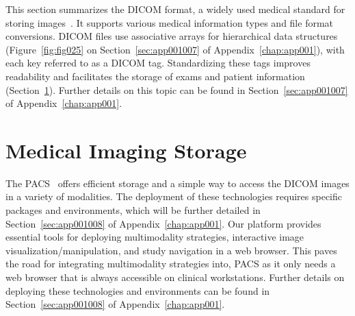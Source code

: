 This section summarizes the \acs{DICOM} format, a widely used medical standard for storing images~\cite{Trivedi2019}.
It supports various medical information types and file format conversions.
\acs{DICOM} files use associative arrays for hierarchical data structures (Figure~\ref{fig:fig025} on Section~\ref{sec:app001007} of Appendix~\ref{chap:app001}), with each key referred to as a \acs{DICOM} tag.
Standardizing these tags improves readability and facilitates the storage of exams and patient information (Section~\ref{sec:chap002008}).
Further details on this topic can be found in Section~\ref{sec:app001007} of Appendix~\ref{chap:app001}.

\section{Medical Imaging Storage}
\label{sec:chap002008}

The \acs{PACS}~\cite{carter2018digital} offers efficient storage and a simple way to access the \acs{DICOM} images in a variety of modalities.
The deployment of these technologies requires specific packages and environments, which will be further detailed in Section~\ref{sec:app001008} of Appendix~\ref{chap:app001}.
Our platform provides essential tools for deploying multimodality strategies, interactive image visualization/manipulation, and study navigation in a web browser.
This paves the road for integrating multimodality strategies into, \acs{PACS} as it only needs a web browser that is always accessible on clinical workstations.
Further details on deploying these technologies and environments can be found in Section~\ref{sec:app001008} of Appendix~\ref{chap:app001}.